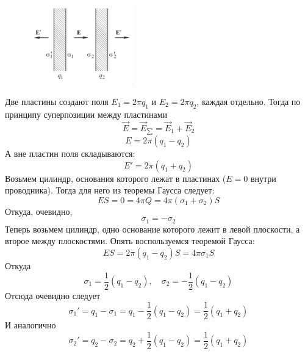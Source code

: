 \documentclass[a4paper,14pt]{extarticle}
\begin{document}
\begin{figure}[h!]
	\centering
	\includegraphics[width=0.4\textwidth]{img.png}
\end{figure}

Две пластины создают поля $E_1=2\pi q_1$ и $E_2=2\pi q_2$, каждая отдельно. Тогда по принципу суперпозиции между пластинами
\begin{equation}
	\vec{E}=\vec{E}_{\sum}=\vec{E}_1+\vec{E}_2
\end{equation}
\begin{equation}
	E=2\pi(q_1-q_2)
\end{equation}
А вне пластин поля складываются:
\begin{equation}
	E'=2\pi(q_1+q_2)
\end{equation}
Возьмем цилиндр, основания которого лежат в пластинах ($E=0$ внутри проводника). Тогда для него из теоремы Гаусса следует:
\begin{equation}
	ES=0=4\pi Q=4\pi(\sigma_1+\sigma_2)S
\end{equation}
Откуда, очевидно,
\begin{equation}
	\sigma_1=-\sigma_2
\end{equation}
Теперь возьмем цилиндр, одно основание которого лежит в левой плоскости, а второе между плоскостями. Опять воспользуемся теоремой Гаусса:
\begin{equation}
	ES=2\pi(q_1-q_2)S=4\pi\sigma_1S
\end{equation}
Откуда
\begin{equation}
	\sigma_1=\frac12(q_1-q_2), \quad \sigma_2=-\frac12(q_1-q_2)
\end{equation}
Отсюда очевидно следует
\begin{equation}
	\sigma_1'=q_1-\sigma_1=q_1-\frac12(q_1-q_2)=\frac12(q_1+q_2)
\end{equation}
И аналогично
\begin{equation}
	\sigma_2'=q_2-\sigma_2=q_2+\frac12(q_1-q_2)=\frac12(q_1+q_2)
\end{equation}


%
\end{document}
